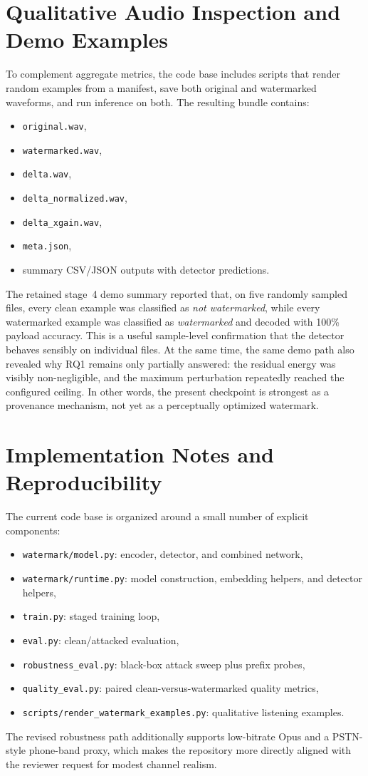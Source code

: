 \section{Qualitative Audio Inspection and Demo Examples}
To complement aggregate metrics, the code base includes scripts that render random examples from a manifest, save both original and watermarked waveforms, and run inference on both. The resulting bundle contains:
\begin{itemize}[leftmargin=1.25em]
  \item \texttt{original.wav},
  \item \texttt{watermarked.wav},
  \item \texttt{delta.wav},
  \item \texttt{delta\_normalized.wav},
  \item \texttt{delta\_xgain.wav},
  \item \texttt{meta.json},
  \item summary CSV/JSON outputs with detector predictions.
\end{itemize}
The retained stage~4 demo summary reported that, on five randomly sampled files, every clean example was classified as \emph{not watermarked}, while every watermarked example was classified as \emph{watermarked} and decoded with 100\% payload accuracy. This is a useful sample-level confirmation that the detector behaves sensibly on individual files. At the same time, the same demo path also revealed why RQ1 remains only partially answered: the residual energy was visibly non-negligible, and the maximum perturbation repeatedly reached the configured ceiling. In other words, the present checkpoint is strongest as a provenance mechanism, not yet as a perceptually optimized watermark.

\section{Implementation Notes and Reproducibility}
The current code base is organized around a small number of explicit components:
\begin{itemize}[leftmargin=1.25em]
  \item \texttt{watermark/model.py}: encoder, detector, and combined network,
  \item \texttt{watermark/runtime.py}: model construction, embedding helpers, and detector helpers,
  \item \texttt{train.py}: staged training loop,
  \item \texttt{eval.py}: clean/attacked evaluation,
  \item \texttt{robustness\_eval.py}: black-box attack sweep plus prefix probes,
  \item \texttt{quality\_eval.py}: paired clean-versus-watermarked quality metrics,
  \item \texttt{scripts/render\_watermark\_examples.py}: qualitative listening examples.
\end{itemize}
The revised robustness path additionally supports low-bitrate Opus and a PSTN-style phone-band proxy, which makes the repository more directly aligned with the reviewer request for modest channel realism.

